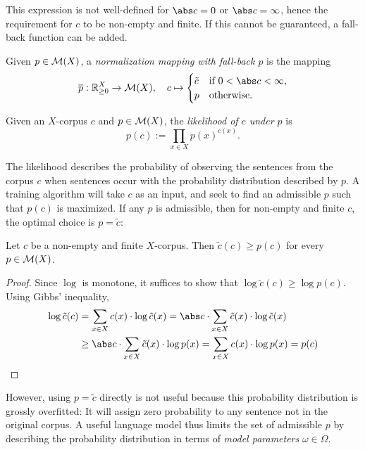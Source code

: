 This expression is not well-defined for $\abs c = 0$ or $\abs c = \infty$,
hence the requirement for $c$ to be non-empty and finite. If this cannot be
guaranteed, a fall-back function can be added.

\begin{definition}
 Given $p\in\mathcal M(X)$, a \emph{normalization mapping with fall-back $p$} is the
 mapping
 \[
  \overline p: \zr_{\geq0}^X \to \um(X),
  \quad
  c \mapsto \begin{cases}
   \tilde c & \text{if } 0 < \abs c < \infty, \\ p & \text{otherwise}.
  \end{cases}
 \]
\end{definition}

\begin{definition}
 Given an $X$-corpus $c$ and $p\in\mathcal M(X)$, the \emph{likelihood of $c$ under
 $p$} is
 \[
  p(c) := \prod_{x\in X} p(x)^{c(x)}.
 \]
\end{definition}

The likelihood describes the probability of observing the sentences from the
corpus $c$ when sentences occur with the probability distribution described by
$p$. A training algorithm will take $c$ as an input, and seek to find an
admissible $p$ such that $p(c)$ is maximized. If any $p$ is admissible, then
for non-empty and finite $c$, the optimal choice is $p = \tilde c$:

\begin{lemma}\label{lemma:empirical1}
 Let $c$ be a non-empty and finite $X$-corpus. Then $\tilde c(c) \geq p(c)$ for
 every $p\in\mathcal M(X)$.
\end{lemma}

\begin{proof}
 Since $\log$ is monotone, it suffices to show that $\log\tilde c(c) \geq \log
 p(c)$. Using Gibbs' inequality,
 \begin{align*}
  \log \tilde c(c)
  &= \sum_{x\in X} c(x) \cdot \log \tilde c(x)
  = \abs c \cdot \sum_{x\in X} \tilde c(x) \cdot \log \tilde c(x) \\
  &\geq \abs c \cdot \sum_{x\in X} \tilde c(x) \cdot \log p(x)
  = \sum_{x\in X} c(x) \cdot \log p(x)
  = p(c)
  \qedhere
 \end{align*}
\end{proof}

However, using $p = \tilde c$ directly is not useful because this probability
distribution is grossly overfitted: It will assign zero probability to any
sentence not in the original corpus. A useful language model thus limits the
set of admissible $p$ by describing the probability distribution in terms of
\emph{model parameters} $\omega\in\Omega$.

